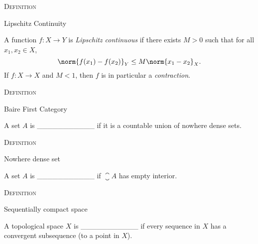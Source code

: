 \documentclass{article}
\newenvironment{flashcard}[2][]{%
\noindent  \textsc{#1}

\vfill 
\centerline{{\Large{#2}}}
\vfill
\newpage \vspace*{\stretch{1}} \noindent
}
{\vspace*{\stretch{1}}\newpage}
\begin{document}
\begin{flashcard}[Definition]{Lipschitz Continuity}
A function $f:X\to Y$ is \emph{Lipschitz continuous} if there exists $M>0$ such that for all $x_1, x_2\in X$, 
$$\norm{f(x_1)-f(x_2)}_Y \leq M\norm{x_1-x_2}_X.$$
If $f:X\to X$ and $M<1$, then $f$ is in particular a \emph{contraction}. 
\end{flashcard}

\begin{flashcard}[Definition]{Baire First Category}
A set $A$ is \_\_\_\_\_\_\_\_\_\_\_ if it is a countable union of nowhere dense sets.
\end{flashcard}

\begin{flashcard}[Definition]{Nowhere dense set}
A set $A$ is \_\_\_\_\_\_\_\_\_\_\_ if $\closure{A}$ has empty interior. 
\end{flashcard}

\begin{flashcard}[Definition]{Sequentially compact space}
A topological space $X$ is \_\_\_\_\_\_\_\_\_\_\_ if every sequence in $X$ has a convergent subsequence (to a point in $X$). 
\end{flashcard}
\end{document}
